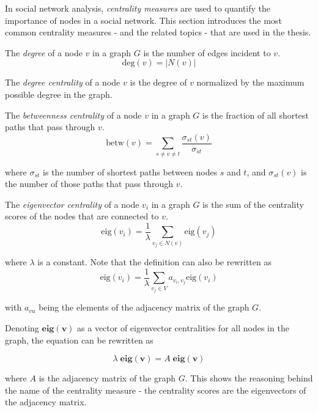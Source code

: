 In social network analysis, \textit{centrality measures} are used to quantify the importance of nodes in a social network.
This section introduces the most common centrality measures - and the related topics - that are used in the thesis.

\begin{definition}
    The \textit{degree} of a node $v$ in a graph $G$ is the number of edges incident to $v$.
    $$
    \text{deg}(v) = |N(v)|
    $$

    The \textit{degree centrality} of a node $v$ is the degree of $v$ normalized by the maximum possible degree in the graph.
\end{definition}

\begin{definition}
    The \textit{betweenness centrality} of a node $v$ in a graph $G$ is the fraction of all shortest paths that pass through $v$.
    $$
    \text{betw}(v) = \sum_{s \neq v \neq t} \frac{\sigma_{st}(v)}{\sigma_{st}}
    $$

    where $\sigma_{st}$ is the number of shortest paths between nodes $s$ and $t$, and $\sigma_{st}(v)$ is the number of those paths that pass through $v$.
\end{definition}

\begin{definition}
    The \textit{eigenvector centrality} of a node $v_i$ in a graph $G$ is the sum of the centrality scores of the nodes that are connected to $v$.
    $$
    \text{eig}(v_i) = \frac{1}{\lambda} \sum_{v_j \in N(v)} \text{eig}(v_j)
    $$

    where $\lambda$ is a constant. Note that the definition can also be rewritten as 
    $$
    \text{eig}(v_i) = \frac{1}{\lambda} \sum_{v_j \in V} a_{v_i, v_j} \text{eig}(v_i)
    $$

    with $a_{vu}$ being the elements of the adjacency matrix of the graph $G$.
    
    Denoting $\mathbf{eig(v)}$ as a vector of eigenvector centralities for all nodes in the graph, the equation can be rewritten as

    $$
    \lambda \; \mathbf{eig(v)} = A \; \mathbf{eig(v)}
    $$

    where $A$ is the adjacency matrix of the graph $G$. 
    This shows the reasoning behind the name of the centrality measure - the centrality scores are the eigenvectors of the adjacency matrix.
\end{definition}

